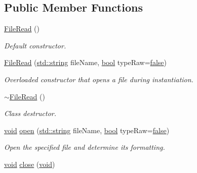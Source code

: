 \subsection*{Public Member Functions}
\begin{DoxyCompactItemize}
\item 
\hyperlink{class_nyq_1_1_file_read_ad19f0ae8129a9e0750f37ba4741ab32b}{File\+Read} ()
\begin{DoxyCompactList}\small\item\em Default constructor. \end{DoxyCompactList}\item 
\hyperlink{class_nyq_1_1_file_read_add4eb7d9d288440c7e13ff2fa7383715}{File\+Read} (\hyperlink{test__lib_f_l_a_c_2format_8c_ab02026ad0de9fb6c1b4233deb0a00c75}{std\+::string} file\+Name, \hyperlink{mac_2config_2i386_2lib-src_2libsoxr_2soxr-config_8h_abb452686968e48b67397da5f97445f5b}{bool} type\+Raw=\hyperlink{mac_2config_2i386_2lib-src_2libsoxr_2soxr-config_8h_a65e9886d74aaee76545e83dd09011727}{false})
\begin{DoxyCompactList}\small\item\em Overloaded constructor that opens a file during instantiation. \end{DoxyCompactList}\item 
\hyperlink{class_nyq_1_1_file_read_aa197e5303e8a5a62ba6e8fbb2c5fd5ac}{$\sim$\+File\+Read} ()
\begin{DoxyCompactList}\small\item\em Class destructor. \end{DoxyCompactList}\item 
\hyperlink{sound_8c_ae35f5844602719cf66324f4de2a658b3}{void} \hyperlink{class_nyq_1_1_file_read_a3b87c3ce03e7bdd196c5ae8f364a2e3a}{open} (\hyperlink{test__lib_f_l_a_c_2format_8c_ab02026ad0de9fb6c1b4233deb0a00c75}{std\+::string} file\+Name, \hyperlink{mac_2config_2i386_2lib-src_2libsoxr_2soxr-config_8h_abb452686968e48b67397da5f97445f5b}{bool} type\+Raw=\hyperlink{mac_2config_2i386_2lib-src_2libsoxr_2soxr-config_8h_a65e9886d74aaee76545e83dd09011727}{false})
\begin{DoxyCompactList}\small\item\em Open the specified file and determine its formatting. \end{DoxyCompactList}\item 
\hyperlink{sound_8c_ae35f5844602719cf66324f4de2a658b3}{void} \hyperlink{class_nyq_1_1_file_read_a59c75117642a01c3c18b1a21a67db1c1}{close} (\hyperlink{sound_8c_ae35f5844602719cf66324f4de2a658b3}{void})

\end{DoxyCompactItemize}
